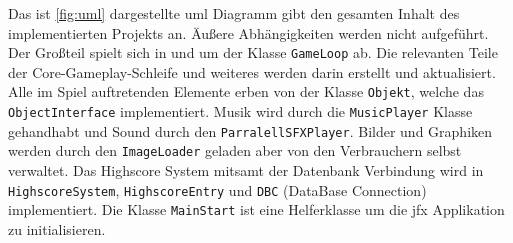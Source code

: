 Das ist \autoref{fig:uml} dargestellte \gls{uml} Diagramm gibt den gesamten Inhalt des implementierten Projekts an.
Äußere Abhängigkeiten werden nicht aufgeführt.
Der Großteil spielt sich in und um der Klasse \texttt{GameLoop} ab.
Die relevanten Teile der Core-Gameplay-Schleife und weiteres werden darin erstellt und aktualisiert.
Alle im Spiel auftretenden Elemente erben von der Klasse \texttt{Objekt}, welche das \texttt{ObjectInterface} implementiert.
Musik wird durch die \texttt{MusicPlayer} Klasse gehandhabt und Sound durch den \texttt{ParralellSFXPlayer}.
Bilder und Graphiken werden durch den \texttt{ImageLoader} geladen aber von den Verbrauchern selbst verwaltet.
Das Highscore System mitsamt der Datenbank Verbindung wird in \texttt{HighscoreSystem}, \texttt{HighscoreEntry} und \texttt{DBC} (DataBase Connection) implementiert.
Die Klasse \texttt{MainStart} ist eine Helferklasse um die \gls{jfx} Applikation zu initialisieren.
